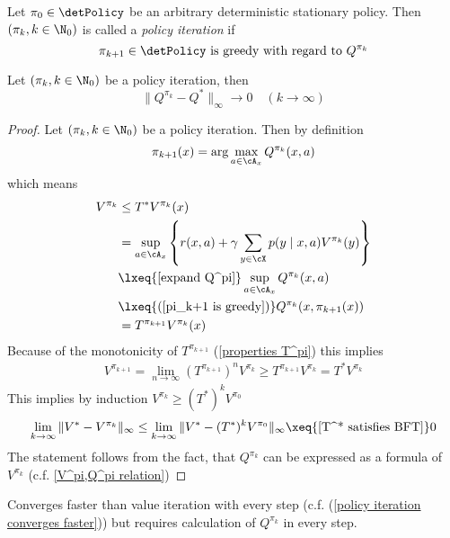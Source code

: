 \begin{definition}\label{policy iteration} Let \(\pi_0\in\detPolicy\) be an arbitrary deterministic stationary policy. Then
	\((\pi_k,k\in\N_0)\) is called a \emph{policy iteration} if
	\[
		\pi_{k+1}\in\detPolicy \text{ is greedy with regard to } Q^{\pi_k}
	\]
\end{definition}

\begin{prop}
	Let \((\pi_k,k\in\N_0)\) be a policy iteration, then
	\[\|Q^{\pi_k}-Q^*\|_\infty \to 0 \quad (k\to\infty) \] 
\end{prop}
\begin{proof}
	Let \((\pi_k,k\in\N_0)\) be a policy iteration. Then by definition
	\begin{align}\label{pi_k+1 is greedy}
		\pi_{k+1}(x)=\arg\max_{a\in\cA_x} Q^{\pi_k}(x,a) 
	\end{align}
	which means
	\begin{align}
		V^{\pi_k} &\le T^* V^{\pi_k}(x)
		\label{real improvement or optimal}\\
		&=\sup_{a\in\cA_x}\left\{r(x,a)+\gamma \sum_{y\in\cX}p(y\mid x,a)V^{\pi_k}(y) \right\}
		\nonumber\\
		&\lxeq{\text{\ref{expand Q^pi}}}\sup_{a\in\cA_x}Q^{\pi_k}(x,a)
		\nonumber\\
		&\lxeq{\text{(\ref{pi_k+1 is greedy})} }Q^{\pi_k}(x,\pi_{k+1}(x))
		\nonumber\\
		&=T^{\pi_{k+1}}V^{\pi_k}(x)
		\nonumber
	\end{align}
	Because of the monotonicity of \(T^{\pi_{k+1}}\) (\ref{properties T^pi}) this implies
	\begin{align}\label{policy iteration converges faster}
		V^{\pi_{k+1}}=\lim_{n\to\infty}(T^{\pi_{k+1}})^n V^{\pi_k}
		\ge T^{\pi_{k+1}} V^{\pi_k} 
		= T^* V^{\pi_k}
	\end{align}
	This implies by induction \(V^{\pi_{k}} \ge (T^*)^k V^{\pi_0}\)
	\begin{align*}
		\lim_{k\to\infty} \|V^* - V^{\pi_k}\|_\infty 
		\le \lim_{k\to\infty} \|V^* - (T^*)^k V^{\pi_0}\|_\infty 
		\xeq{\text{\ref{T^* satisfies BFT}}} 0
	\end{align*}
	The statement follows from the fact, that \(Q^{\pi_k}\) can be expressed as a formula of \(V^{\pi_k}\) (c.f. \ref{V^pi,Q^pi relation}) 
\end{proof}  

Converges faster than value iteration with every step 
(c.f. (\ref{policy iteration converges faster})) but requires calculation of \(Q^{\pi_k}\) in every step.

